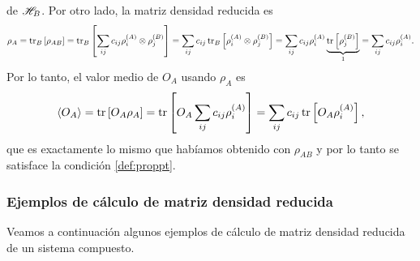 \documentclass[10pt, a4paper]{article}
\numberwithin{equation}{subsection}
\begin{document}
de $\mathscr{H}_B$. Por otro lado, la matriz densidad reducida es
\begin{equation}
  \rho_{A}
  = \tr_B\left[\rho_{AB}\right]
  = \tr_B\left[\sum_{ij}c_{ij} \rho^{(A)}_{i} \otimes \rho^{(B)}_{j}\right]
  = \sum_{ij}c_{ij} \tr_B\left[\rho^{(A)}_{i} \otimes \rho^{(B)}_{j}\right]
  = \sum_{ij}c_{ij} \rho^{(A)}_{i}
    \underbrace{\tr\left[\rho^{(B)}_{j}\right]}_{1}
  = \sum_{ij}c_{ij} \rho^{(A)}_{i}.
\end{equation}
Por lo tanto, el valor medio de $O_A$ usando $\rho_A$ es
\begin{equation}
  \expval{O_A}
  = \tr\left[O_A\rho_A\right]
  = \tr\left[O_A \sum_{ij}c_{ij} \rho^{(A)}_{i}\right]
  = \sum_{ij}c_{ij} \tr\left[O_A \rho^{(A)}_{i}\right],
\end{equation}
que es exactamente lo mismo que habíamos obtenido con $\rho_{AB}$ y por lo
tanto se satisface la condición \eqref{def:proppt}.

\subsubsection{Ejemplos de cálculo de matriz densidad reducida}
Veamos a continuación algunos ejemplos de cálculo de matriz densidad reducida
de un sistema compuesto.
\end{document}
